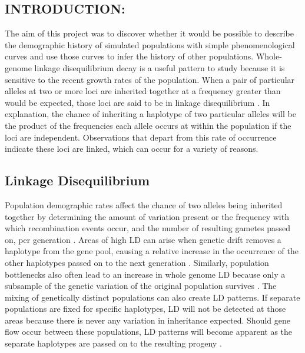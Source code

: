 \documentclass[11pt]{article}
\begin{document}
\begin{linenumbers}
\section{INTRODUCTION:}
The aim of this project was to discover whether it would be possible to describe the demographic history of simulated populations with simple phenomenological curves and use those curves to infer the history of other populations. Whole-genome linkage disequilibrium decay is a useful pattern to study because it is sensitive to the recent growth rates of the population. When a pair of particular alleles at two or more loci are inherited together at a frequency greater than would be expected, those loci are said to be in linkage disequilibrium \citep{slatkin2008linkage}. In explanation, the chance of inheriting a haplotype of two particular alleles will be the product of the frequencies each allele occurs at within the population if the loci are independent. Observations that depart from this rate of occurrence indicate these loci are linked, which can occur for a variety of reasons. 

\subsection{Linkage Disequilibrium}
Population demographic rates affect the chance of two alleles being inherited together by determining the amount of variation present or the frequency with which recombination events occur, and the number of resulting gametes passed on, per generation \citep{hartl1997principles, reich2001linkage}. Areas of high LD can arise when genetic drift removes a haplotype from the gene pool, causing a relative increase in the occurrence of the other haplotypes passed on to the next generation \citep{slatkin2008linkage}. Similarly, population bottlenecks also often lead to an increase in whole genome LD because only a subsample of the genetic variation of the original population survives \citep{pritchard2001linkage, slatkin2008linkage}. The mixing of genetically distinct populations can also create LD patterns. If separate populations are fixed for specific haplotypes, LD will not be detected at those areas because there is never any variation in inheritance expected. Should gene flow occur between these populations, LD patterns will become apparent as the separate haplotypes are passed on to the resulting progeny \citep{pritchard2001linkage, slatkin2008linkage}.


\end{linenumbers}
\end{document}
